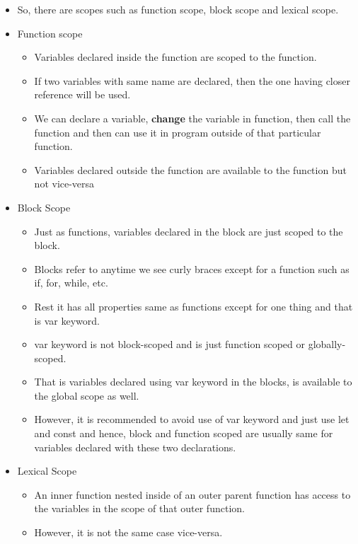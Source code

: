 \documentclass[
  paper=a4,
  ,captions=tableheading
]{scrartcl}
\providecommand{\tightlist}{%
  \setlength{\itemsep}{0pt}\setlength{\parskip}{0pt}}
\begin{document}
\begin{itemize}
\tightlist
\item
  So, there are scopes such as function scope, block scope and lexical
  scope.
\item
  Function scope

  \begin{itemize}
  \tightlist
  \item
    Variables declared inside the function are scoped to the function.
  \item
    If two variables with same name are declared, then the one having
    closer reference will be used.
  \item
    We can declare a variable, \textbf{change} the variable in function,
    then call the function and then can use it in program outside of
    that particular function.
  \item
    Variables declared outside the function are available to the
    function but not vice-versa
  \end{itemize}
\item
  Block Scope

  \begin{itemize}
  \tightlist
  \item
    Just as functions, variables declared in the block are just scoped
    to the block.
  \item
    Blocks refer to anytime we see curly braces except for a function
    such as if, for, while, etc.
  \item
    Rest it has all properties same as functions except for one thing
    and that is var keyword.
  \item
    var keyword is not block-scoped and is just function scoped or
    globally-scoped.
  \item
    That is variables declared using var keyword in the blocks, is
    available to the global scope as well.
  \item
    However, it is recommended to avoid use of var keyword and just use
    let and const and hence, block and function scoped are usually same
    for variables declared with these two declarations.
  \end{itemize}
\item
  Lexical Scope

  \begin{itemize}
  \tightlist
  \item
    An inner function nested inside of an outer parent function has
    access to the variables in the scope of that outer function.
  \item
    However, it is not the same case vice-versa.
  \end{itemize}
\end{itemize}
\end{document}
